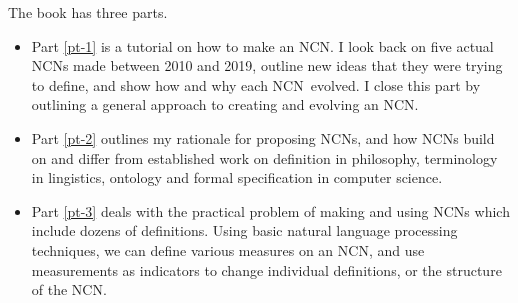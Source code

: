 \documentclass[graybox,envcountchap,sectrefs]{svmono}
\newcommand{\ncn}{NCN}
\newcommand{\ncnf}{New Concept Network}
\begin{document}
The book has three parts.
\begin{itemize}
  \item Part \ref{pt-1} is a tutorial on how to make an \ncn. I look back on five actual \ncn s made between 2010 and 2019, outline new ideas that they were trying to define, and show how and why each \ncn\ evolved. I close this part by outlining a general approach to creating and evolving an \ncn.
  \item Part \ref{pt-2} outlines my rationale for proposing \ncn s, and how \ncn s build on and differ from established work on definition in philosophy, terminology in lingistics, ontology and formal specification in computer science.
  \item Part \ref{pt-3} deals with the practical problem of making and using \ncn s which include dozens of definitions. Using basic natural language processing techniques, we can define various measures on an \ncn, and use measurements as indicators to change individual definitions, or the structure of the \ncn. 
\end{itemize}





\end{document}
